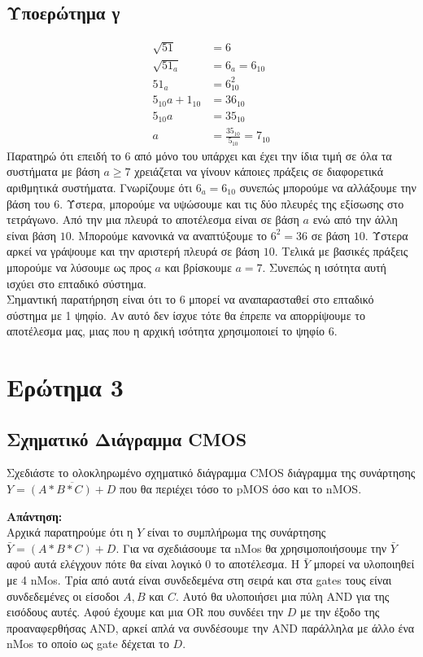 \documentclass[]{article}
\begin{document}
\subsection{Υποερώτημα γ}
\begin{align*}
	\sqrt{51}        & = 6                               \\
	\sqrt{51_a}      & = 6_a = 6_{10}                    \\
	51_a             & = 6_{10}^2                        \\
	5_{10}a + 1_{10} & = 36_{10}                         \\
	5_{10}a          & = 35_{10}                         \\
	a                & = \frac{35_{10}}{5_{10}} = 7_{10}
\end{align*}
Παρατηρώ ότι επειδή το $6$ από μόνο του υπάρχει και έχει την ίδια τιμή σε όλα τα συστήματα με βάση $a \ge 7$ χρειάζεται να γίνουν κάποιες πράξεις σε διαφορετικά αριθμητικά συστήματα.
Γνωρίζουμε ότι $6_a = 6_{10}$ συνεπώς μπορούμε να αλλάξουμε την βάση του $6$. Ύστερα, μπορούμε να υψώσουμε και τις δύο πλευρές της εξίσωσης στο τετράγωνο. Από την μια πλευρά το αποτέλεσμα είναι σε βάση $a$ ενώ από την άλλη είναι βάση $10$.
Μπορούμε κανονικά να αναπτύξουμε το $6^2 = 36$ σε βάση $10$. Ύστερα αρκεί να γράψουμε και την αριστερή πλευρά σε βάση $10$. Τελικά με βασικές πράξεις μπορούμε να λύσουμε ως προς $a$ και βρίσκουμε $a = 7$.
Συνεπώς η ισότητα αυτή ισχύει στο επταδικό σύστημα. \\
Σημαντική παρατήρηση είναι ότι το $6$ μπορεί να αναπαρασταθεί στο επταδικό σύστημα με 1 ψηφίο. Αν αυτό δεν ίσχυε τότε θα έπρεπε να απορρίψουμε το αποτέλεσμα μας, μιας που η αρχική ισότητα χρησιμοποιεί το ψηφίο $6$.

\newpage

\section{Ερώτημα 3}

\subsection{Σχηματικό Διάγραμμα CMOS}
Σχεδιάστε το ολοκληρωμένο σχηματικό διάγραμμα CMOS διάγραμμα της συνάρτησης $Y=\overline{(A * B * C) + D}$ που θα περιέχει τόσο το pMOS όσο και το nMOS.

\textbf{Απάντηση: }\\
Αρχικά παρατηρούμε ότι η $Y$ είναι το συμπλήρωμα της συνάρτησης $\bar{Y} = (A * B * C) + D$.
Για να σχεδιάσουμε τα nMos θα χρησιμοποιήσουμε την $\bar{Y}$ αφού αυτά ελέγχουν πότε θα είναι λογικό 0 το αποτέλεσμα.
Η $\bar{Y}$ μπορεί να υλοποιηθεί με 4 nMos. Τρία από αυτά είναι συνδεδεμένα στη σειρά και στα gates τους είναι συνδεδεμένες οι είσοδοι $A, B$ και $C$.
Αυτό θα υλοποιήσει μια πύλη AND για της εισόδους αυτές. Αφού έχουμε και μια OR που συνδέει την $D$ με την έξοδο της προαναφερθήσας AND,
αρκεί απλά να συνδέσουμε την AND παράλληλα με άλλο ένα nMos το οποίο ως gate δέχεται το $D$.
\end{document}
